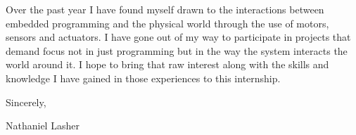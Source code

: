 \documentclass[11pt,letterpaper]{letter}
\begin{document}
\vspace{0.5em}
\hspace{2em} Over the past year I have found myself drawn to the interactions between embedded programming and the physical world through the use of motors, sensors and actuators. I have gone out of my way to participate in projects that demand focus not in just programming but in the way the system interacts the world around it. I hope to bring that raw interest along with the skills and knowledge I have gained in those experiences to this internship.

\vspace{0.5em}
\hspace{2em}

\vspace{0.4in}

\setlength{\parindent}{0em}
Sincerely,

\vspace{0.6in}

Nathaniel Lasher
\end{document}
